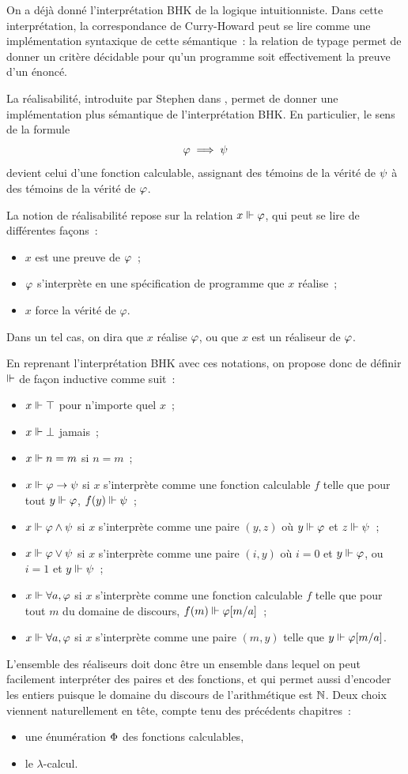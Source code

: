 On a déjà donné l'interprétation BHK de la logique intuitionniste. Dans cette
interprétation, la correspondance de Curry-Howard peut se lire comme une
implémentation syntaxique de cette sémantique~: la relation de typage permet de
donner un critère décidable pour qu'un programme soit effectivement la preuve
d'un énoncé.

La réalisabilité, introduite par Stephen  dans \cite{Kleene1945},
permet de donner une implémentation plus sémantique de l'interprétation BHK. En
particulier, le sens de la formule
\[\varphi \implies \psi\]
devient celui d'une fonction calculable, assignant des témoins de la vérité de
$\psi$ à des témoins de la vérité de $\varphi$.

La notion de réalisabilité repose sur la relation $x\Vdash \varphi$, qui peut
se lire de différentes façons~:
\begin{itemize}
\item $x$ est une preuve de $\varphi$~;
\item $\varphi$ s'interprète en une spécification de programme que $x$ réalise~;
\item $x$ force la vérité de $\varphi$.
\end{itemize}
Dans un tel cas, on dira que $x$ réalise $\varphi$, ou que $x$ est un réaliseur
de $\varphi$.

En reprenant l'interprétation BHK avec ces notations, on propose donc de
définir $\Vdash$ de façon inductive comme suit~:
\begin{itemize}
\item $x \Vdash \top$ pour n'importe quel $x$~;
\item $x \Vdash \bot$ jamais~;
\item $x \Vdash n = m$ si $n = m$~;
\item $x \Vdash \varphi \to \psi$ si $x$ s'interprète comme une fonction
  calculable $f$ telle que pour tout $y \Vdash \varphi$, $f(y)\Vdash \psi$~;
\item $x \Vdash \varphi \land \psi$ si $x$ s'interprète comme une paire $(y,z)$
  où $y \Vdash \varphi$ et $z \Vdash \psi$~;
\item $x \Vdash \varphi \lor \psi$ si $x$ s'interprète comme une paire $(i,y)$
  où $i = 0$ et $y \Vdash \varphi$, ou $i = 1$ et $y \Vdash \psi$~;
\item $x \Vdash \forall a, \varphi$ si $x$ s'interprète comme une fonction
  calculable $f$ telle que pour tout $m$ du domaine de discours,
  $f(m) \Vdash \varphi[m/a]$~;
\item $x \Vdash \forall a, \varphi$ si $x$ s'interprète comme une paire
  $(m,y)$ telle que  $y \Vdash \varphi[m/a]$.
\end{itemize}
L'ensemble des réaliseurs doit donc être un ensemble dans lequel on peut
facilement interpréter des paires et des fonctions, et qui permet aussi
d'encoder les entiers puisque le domaine du discours de l'arithmétique est
$\mathbb N$. Deux choix viennent naturellement en tête, compte tenu des précédents
chapitres~:
\begin{itemize}
\item une énumération $\operatorname{\Phi}$ des fonctions calculables,
\item le $\lambda$-calcul.
\end{itemize}

